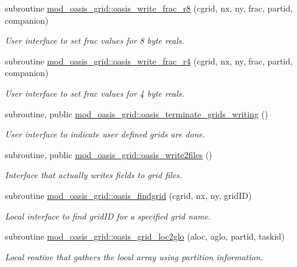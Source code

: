 \begin{DoxyCompactItemize}
subroutine \hyperlink{namespacemod__oasis__grid_acf5aadf5df317f065c5ced3de9662aac}{mod\+\_\+oasis\+\_\+grid\+::oasis\+\_\+write\+\_\+frac\+\_\+r8} (cgrid, nx, ny, frac, partid, companion)
\begin{DoxyCompactList}\small\item\em User interface to set frac values for 8 byte reals. \end{DoxyCompactList}\item 
subroutine \hyperlink{namespacemod__oasis__grid_ac6cd6ea8952c6e6df18a80d36c1f95f9}{mod\+\_\+oasis\+\_\+grid\+::oasis\+\_\+write\+\_\+frac\+\_\+r4} (cgrid, nx, ny, frac, partid, companion)
\begin{DoxyCompactList}\small\item\em User interface to set frac values for 4 byte reals. \end{DoxyCompactList}\item 
subroutine, public \hyperlink{namespacemod__oasis__grid_a59755e271ccdd0c98807b5938ef33e78}{mod\+\_\+oasis\+\_\+grid\+::oasis\+\_\+terminate\+\_\+grids\+\_\+writing} ()
\begin{DoxyCompactList}\small\item\em User interface to indicate user defined grids are done. \end{DoxyCompactList}\item 
subroutine, public \hyperlink{namespacemod__oasis__grid_a275791c512cefae9799e188d92b6f9d4}{mod\+\_\+oasis\+\_\+grid\+::oasis\+\_\+write2files} ()
\begin{DoxyCompactList}\small\item\em Interface that actually writes fields to grid files. \end{DoxyCompactList}\item 
subroutine \hyperlink{namespacemod__oasis__grid_aa1b2c3dc81299472185c1e7142d143e0}{mod\+\_\+oasis\+\_\+grid\+::oasis\+\_\+findgrid} (cgrid, nx, ny, grid\+ID)
\begin{DoxyCompactList}\small\item\em Local interface to find grid\+ID for a specified grid name. \end{DoxyCompactList}\item 
subroutine \hyperlink{namespacemod__oasis__grid_a5aba1fce549be5f9db2fda5374d588e1}{mod\+\_\+oasis\+\_\+grid\+::oasis\+\_\+grid\+\_\+loc2glo} (aloc, aglo, partid, taskid)
\begin{DoxyCompactList}\small\item\em Local routine that gathers the local array using partition information. \end{DoxyCompactList}\end{DoxyCompactItemize}
